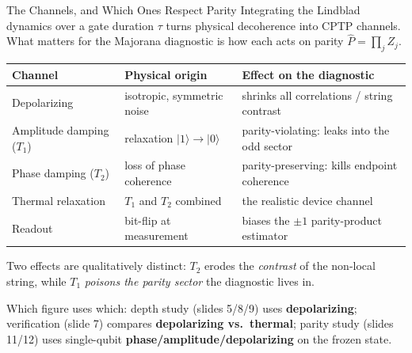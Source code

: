 \documentclass[aspectratio=169,12pt]{beamer}
\newcommand{\ket}[1]{|#1\rangle}
\newcommand{\Pop}{\hat{P}}
\begin{document}
\begin{frame}{The Channels, and Which Ones Respect Parity}
  Integrating the Lindblad dynamics over a gate duration $\tau$ turns physical decoherence into CPTP channels. What matters for the Majorana diagnostic is how each acts on parity $\Pop=\prod_j Z_j$.
  \begin{center}\scriptsize
  \begin{tabular}{@{}l l p{5.4cm}@{}}
    \toprule
    Channel & Physical origin & Effect on the diagnostic\\
    \midrule
    Depolarizing & isotropic, symmetric noise & shrinks all correlations / string contrast\\
    Amplitude damping ($T_1$) & relaxation $\ket1\!\to\!\ket0$ & \textcolor{trivial}{parity-violating}: leaks into the odd sector\\
    Phase damping ($T_2$) & loss of phase coherence & \textcolor{topological}{parity-preserving}: kills endpoint coherence\\
    Thermal relaxation & $T_1$ and $T_2$ combined & the realistic device channel\\
    Readout & bit-flip at measurement & biases the $\pm1$ parity-product estimator\\
    \bottomrule
  \end{tabular}
  \end{center}
  \vspace{0.1cm}
  {\small Two effects are qualitatively distinct: $T_2$ erodes the \emph{contrast} of the non-local string, while $T_1$ \emph{poisons the parity sector} the diagnostic lives in.}

  \vspace{0.05cm}
  {\scriptsize Which figure uses which: depth study (slides 5/8/9) uses \textbf{depolarizing}; verification (slide 7) compares \textbf{depolarizing vs.\ thermal}; parity study (slides 11/12) uses single-qubit \textbf{phase/amplitude/depolarizing} on the frozen state.}
\end{frame}
\end{document}
